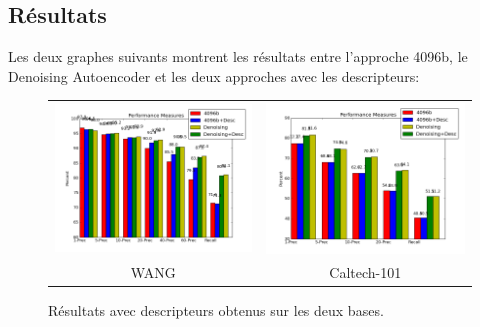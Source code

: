  


\subsection{Résultats}
	Les deux graphes suivants montrent les résultats entre l'approche 4096b, le Denoising Autoencoder et les deux approches avec les descripteurs:
	
\begin{figure}[H]
\centering
\begin{tabular}{cc}
\centering

\includegraphics[width=9cm]{Figures/results/res-wang3.png}
&
\includegraphics[width=9cm]{Figures/results/res-caltech3.png}\\
WANG & Caltech-101\\
\end{tabular}
\caption[comp7]{Résultats avec descripteurs obtenus sur les deux bases.}
\end{figure}
	

